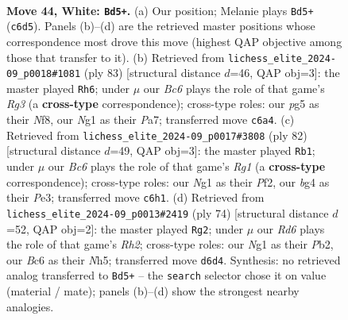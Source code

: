 \documentclass[11pt]{article}
\begin{document}
\clearpage

\begin{figure}[p]\centering
\begin{subfigure}{0.46\textwidth}\centering
\resizebox{\linewidth}{!}{%
\newchessgame
\chessboard[
  setfen={6r1/r4k2/p1BR4/B5p1/5pb1/PP6/1K5P/R5N1 w - - 1 44},
  showmover=false,
  pgfstyle=straightmove, color=movearrow, markmove={c6-d5}
]}
\caption{}
\end{subfigure}\hfill
\begin{subfigure}{0.46\textwidth}\centering
\resizebox{\linewidth}{!}{%
\newchessgame
\chessboard[
  setfen={2r2nk1/p5p1/6r1/1B2p3/3pP3/P6R/1P6/1K5R b - - 1 42},
  showmover=false,
  pgfstyle=straightmove, color=movearrow, markmove={g6-h6}
]}
\caption{}
\end{subfigure}
\\[4pt]
\begin{subfigure}{0.46\textwidth}\centering
\resizebox{\linewidth}{!}{%
\newchessgame
\chessboard[
  setfen={r6k/1r5p/5p1B/2p5/1bP4P/3RP3/2K2P2/6R1 w - - 6 42},
  showmover=false,
  pgfstyle=straightmove, color=movearrow, markmove={g1-b1}
]}
\caption{}
\end{subfigure}\hfill
\begin{subfigure}{0.46\textwidth}\centering
\resizebox{\linewidth}{!}{%
\newchessgame
\chessboard[
  setfen={8/pp3r1k/2p4p/3p3N/1b6/3P4/PP5R/2K5 w - - 8 38},
  showmover=false,
  pgfstyle=straightmove, color=movearrow, markmove={h2-g2}
]}
\caption{}
\end{subfigure}
\caption{\textbf{Move 44, White: \texttt{Bd5+}.} (a) Our position; Melanie plays \texttt{Bd5+} (\texttt{c6d5}). Panels (b)--(d) are the retrieved master positions whose correspondence most drove this move (highest QAP objective among those that transfer to it). (b) Retrieved from \texttt{lichess\_elite\_2024-09\_p0018\#1081} (ply 83) [structural distance $d$=46, QAP obj=3]: the master played \texttt{Rh6}; under $\mu$ our \emph{Bc6} plays the role of that game's \emph{Rg3} (a \textbf{cross-type} correspondence); cross-type roles: our \emph{p}g5 as their \emph{N}f8, our \emph{N}g1 as their \emph{P}a7; transferred move \texttt{c6a4}. (c) Retrieved from \texttt{lichess\_elite\_2024-09\_p0017\#3808} (ply 82) [structural distance $d$=49, QAP obj=3]: the master played \texttt{Rb1}; under $\mu$ our \emph{Bc6} plays the role of that game's \emph{Rg1} (a \textbf{cross-type} correspondence); cross-type roles: our \emph{N}g1 as their \emph{P}f2, our \emph{b}g4 as their \emph{P}e3; transferred move \texttt{c6h1}. (d) Retrieved from \texttt{lichess\_elite\_2024-09\_p0013\#2419} (ply 74) [structural distance $d$=52, QAP obj=2]: the master played \texttt{Rg2}; under $\mu$ our \emph{Rd6} plays the role of that game's \emph{Rh2}; cross-type roles: our \emph{N}g1 as their \emph{P}b2, our \emph{B}c6 as their \emph{N}h5; transferred move \texttt{d6d4}. Synthesis: no retrieved analog transferred to \texttt{Bd5+} -- the \texttt{search} selector chose it on value (material / mate); panels (b)--(d) show the strongest nearby analogies.}
\label{fig:thought-m86}
\end{figure}
\end{document}
